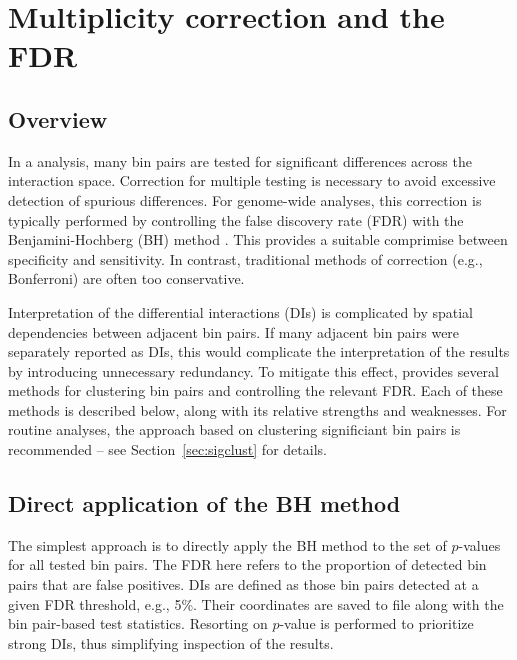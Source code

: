 \documentclass{report}\usepackage[]{graphicx}\usepackage[usenames,dvipsnames]{color}
\begin{document}
\section{Multiplicity correction and the FDR}

\subsection{Overview}
In a  analysis, many bin pairs are tested for significant differences across the interaction space.
Correction for multiple testing is necessary to avoid excessive detection of spurious differences.
For genome-wide analyses, this correction is typically performed by controlling the false discovery rate (FDR) with the Benjamini-Hochberg (BH) method \cite{benjamini1995fdr}. 
This provides a suitable comprimise between specificity and sensitivity.
In contrast, traditional methods of correction (e.g., Bonferroni) are often too conservative.

Interpretation of the differential interactions (DIs) is complicated by spatial dependencies between adjacent bin pairs.
If many adjacent bin pairs were separately reported as DIs, this would complicate the interpretation of the results by introducing unnecessary redundancy.
To mitigate this effect,  provides several methods for clustering bin pairs and controlling the relevant FDR.
Each of these methods is described below, along with its relative strengths and weaknesses.
For routine analyses, the approach based on clustering significiant bin pairs is recommended -- see Section~\ref{sec:sigclust} for details.

\subsection{Direct application of the BH method}
The simplest approach is to directly apply the BH method to the set of $p$-values for all tested bin pairs.
The FDR here refers to the proportion of detected bin pairs that are false positives.
DIs are defined as those bin pairs detected at a given FDR threshold, e.g., 5\%.
Their coordinates are saved to file along with the bin pair-based test statistics.
Resorting on $p$-value is performed to prioritize strong DIs, thus simplifying inspection of the results.
\end{document}
